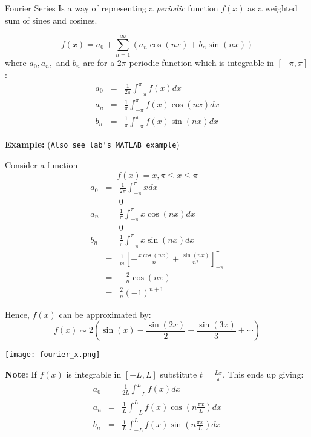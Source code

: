 \documentclass[11pt,titlepage,fleqn]{article}
\begin{document}
\begin{section}{Fourier Series}
Is a way of representing a {\it periodic} function $f(x)$ as a weighted sum of sines and cosines.

\begin{equation}
f(x) = a_0 + \sum_{n=1}^{\infty } (a_n \cos(nx) + b_n \sin(nx))
\end{equation}
where $a_0, a_n,$ and $b_n$ are for a $2\pi$ periodic function which is integrable in $[-\pi, \pi]$:
\begin{eqnarray}
a_0 &=& \frac{1}{2\pi} \int_{-\pi}^\pi f(x) dx\\
a_n &=& \frac{1}{\pi} \int_{-\pi}^\pi f(x) \cos(nx) dx\\
b_n &=& \frac{1}{\pi} \int_{-\pi}^\pi f(x) \sin(nx) dx \label{fourier}
\end{eqnarray}

{\bf Example:}
(\verb+Also see lab's MATLAB example+)

Consider a function
\begin{equation*}
f(x) = x, \pi \leq x \leq \pi
\end{equation*}
\begin{eqnarray*}
a_0 &=& \frac{1}{2\pi} \int_{-\pi}^\pi x dx\\
&=& 0\\
a_n &=& \frac{1}{\pi} \int_{-\pi}^\pi x \cos(nx) dx\\
&=& 0\\
b_n &=& \frac{1}{\pi} \int_{-\pi}^\pi x \sin(nx) dx\\
&=& \frac{1}{pi} \left [ -\frac{x \cos(nx)}{n} + \frac{\sin(nx)}{n^2} \right ]_{-\pi}^\pi \\
&=& -\frac{2}{n} \cos(n\pi)\\
&=& \frac{2}{n} (-1)^{n+1}
\end{eqnarray*}

Hence, $f(x)$ can be approximated by:
\begin{equation*}
f(x) \sim 2 \left ( \sin(x) - \frac{\sin(2x)}{2} + \frac{\sin(3x)}{3} + \cdots \right)
\end{equation*}
\end{section}

\texttt{[image: fourier\_x.png]}

{\bf Note: }
If $f(x)$ is integrable in $[-L, L]$ substitute $t = \frac{Lx}{\pi}$. This ends up giving:
\begin{eqnarray}
a_0 &=& \frac{1}{2L} \int_{-L}^L f(x) dx\\ 
a_n &=& \frac{1}{L} \int_{-L}^L f(x) \cos(n\frac{\pi x}{L}) dx\\ 
b_n &=& \frac{1}{L} \int_{-L}^L f(x) \sin(n\frac{\pi x}{L}) dx \label{fourier_gen}
\end{eqnarray}
\end{document}
